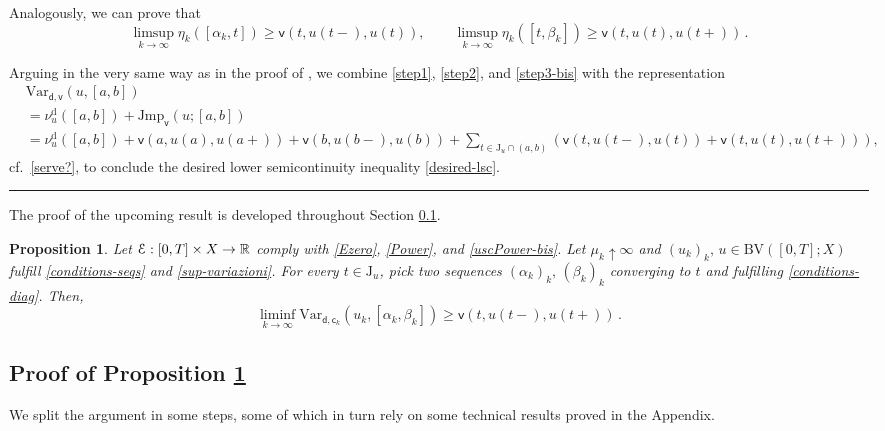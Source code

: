 \documentclass[a4paper,10pt,reqno]{amsart} %
\newcommand{\R}{\mathbb{R}}
\newtheorem{proposition}[theorem]{Proposition}
\numberwithin{equation}{section}
\newcommand{\QED}{\mbox{}\hfill\rule{5pt}{5pt}\medskip\par}
\newcommand{\Xs}{X}
\newcommand{\BV}{\mathrm{BV}}
\newcommand{\mdn}{\mathsf{d}}
\newcommand{\Vari}[4]{\mathrm{Var}_{#1}(#2,[#3,#4])}
\newcommand{\lli}[2]{{#1}({#2}{-})}
\newcommand{\rli}[2]{{#1}({#2}{+})}
\newcommand{\jump}[1]{\mathrm{J}_{#1}}
\newcommand{\Jvar}[4]{\mathrm{Jmp}_{#1}(#2;[#3,#4])}
\newcommand{\mum}[2]{\nu_{#1}^{#2}}
\newcommand{\vecostnamep}[1]{\mathsf{c}_{#1}}
\newcommand{\bvcostname}{\mathsf{v}}
\newcommand{\bvcost}[3]{\mathsf{v}(#1,#2,#3)}
\begin{document}
Analogously, we can prove that
\begin{equation}
\label{step3-bis}
\limsup_{k\to\infty}\eta_k ([\alpha_k,t]) \geq \bvcost t{\lli u t }{u(t)}, \qquad  \limsup_{k\to\infty}\eta_k ([t,\beta_k]) \geq \bvcost t{u (t) }{\rli u t}\,.
\end{equation}
\par
Arguing in the very same way as in the proof of  \cite[Prop.\ 7.3]{MRS13}, we combine  \eqref{step1}, \eqref{step2}, and \eqref{step3-bis}
with the representation 
\[
\begin{aligned}
&
\Vari {\mdn,\bvcostname}u{a}{b}\\
 &  =  \mum u{\mathrm{d}}([a,b]) +  \Jvar {{\bvcostname}}{u}{a}{b}
\\
& 
=  
  \mum u{\mathrm{d}}([a,b]) +
 \bvcost{a}{u(a)}{\rli u{a}} +  \bvcost{b}{\lli u{b}}{ u(b)} + \sum_{t\in \jump u \cap (a,b)} \left(
 \bvcost{t}{\lli u{t}}{u(t)} {+}  \bvcost{t}{u(t)}{\rli u{t}}\right), 
 \end{aligned}
\]
cf.\ \eqref{serve?}, to 
conclude the desired  lower semicontinuity inequality \eqref{desired-lsc}.
\QED
The proof of the upcoming result is  developed throughout  Section \ref{ss:4.1}.
\begin{proposition}
	\label{prop:real-tech-diff}
Let $\calE: [0,T] \times \Xs \to \R$ comply with \eqref{Ezero},  \eqref{Power}, and  \eqref{uscPower-bis}. Let
	 $\mu_k \uparrow \infty$ and  $(u_k)_k,\, u \in \BV([0,T];\Xs)$ fulfill
	\eqref{conditions-seqs} and \eqref{sup-variazioni}. For every $t\in \jump u$, pick two sequences $(\alpha_k)_k,\, (\beta_k)_k$ converging to $t$ and fulfilling \eqref{conditions-diag}. 
	Then,
	\begin{equation}
\label{lsc-dura}
 \liminf_{k\to\infty}   \Vari{\mdn,\vecostnamep k}{u_{k}}{\alpha_k}{\beta_k} \geq \bvcost t{\lli u t }{\rli u t}\,.
\end{equation}
\end{proposition}

\subsection{Proof of Proposition  \ref{prop:real-tech-diff}}
\label{ss:4.1}
We split the argument in some steps, some of which in turn rely on some technical results proved in the Appendix.
\end{document}
